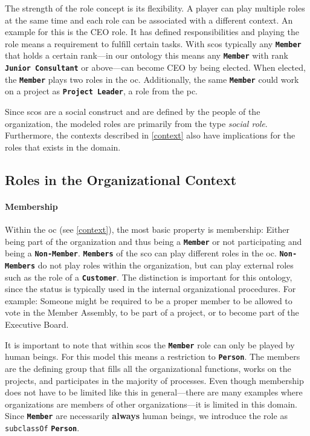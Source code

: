 \documentclass[a4paper, DIV=13, BCOR=0cm]{scrbook}
\newcommand{\class}[1]{\texttt{\textbf{#1}}}
\newcommand{\relation}[1]{\texttt{#1}}
\begin{document}
The strength of the role concept is its flexibility. A player can play multiple roles at the same time and each role can be associated with a different context. An example for this is the CEO role. It has defined responsibilities and playing the role means a requirement to fulfill certain tasks. With \glspl{sco} typically any \class{Member} that holds a certain rank---in our ontology this means any \class{Member} with rank \class{Junior Consultant} or above---can become CEO by being elected. When elected, the \class{Member} plays two roles in the \gls{oc}. Additionally, the same \class{Member} could work on a project as \class{Project Leader}, a role from the \gls{pc}.

Since \glspl{sco} are a social construct and are defined by the people of the organization, the modeled roles are primarily from the type \textit{social role}. Furthermore, the contexts described in \autoref{context} also have implications for the roles that exists in the domain.

\subsection{Roles in the Organizational Context}

\paragraph{Membership}
\label{membership}
Within the \gls{oc} (see \autoref{context}), the most basic property is membership: Either being part of the organization and thus being a \class{Member} or not participating and being a \class{Non-Member}. \class{Members} of the \gls{sco} can play different roles in the \gls{oc}. \class{Non-Members} do not play roles within the organization, but can play external roles such as the role of a \class{Customer}. The distinction is important for this ontology, since the status is typically used in the internal organizational procedures. For example: Someone might be required to be a proper member to be allowed to vote in the Member Assembly, to be part of a project, or to become part of the Executive Board.

It is important to note that within \glspl{sco} the \class{Member} role can only be played by human beings. For this model this means a restriction to \class{Person}. The members are the defining group that fills all the organizational functions, works on the projects, and participates in the majority of processes. Even though membership does not have to be limited like this in general---there are many examples where organizations are members of other organizations---it is limited in this domain. Since \class{Member} are necessarily \textbf{always} human beings, we introduce the role as \relation{subclassOf} \class{Person}.
\end{document}
